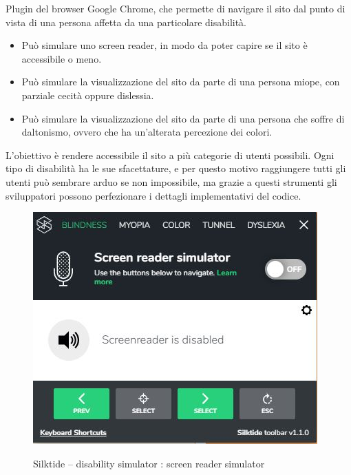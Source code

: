 Plugin del browser Google Chrome, che permette di navigare il sito dal punto di vista di una persona affetta da una particolare disabilità.\\
\begin{itemize}
	\item Può simulare uno screen reader, in modo da poter capire se il sito è accessibile o meno.
	\item Può simulare la visualizzazione del sito da parte di una persona miope, con parziale cecità oppure dislessia.
	\item Può simulare la visualizzazione del sito da parte di una persona che soffre di daltonismo, ovvero che ha un'alterata percezione dei colori.
\end{itemize}
L'obiettivo è rendere accessibile il sito a più categorie di utenti possibili. Ogni tipo di disabilità ha le sue sfacettature, e per questo motivo 
raggiungere tutti gli utenti può sembrare arduo se non impossibile, ma grazie a questi strumenti gli sviluppatori possono perfezionare i dettagli
implementativi del codice.
\begin{figure}[!h]
	\centering
	\includegraphics[width=0.7\linewidth]{sezioni/FaseTest/Immagini/screen_reader_simulator.JPG}\\
	\caption{Silktide – disability simulator : screen reader simulator}
	\label{Fig:silktide}
\end{figure} 